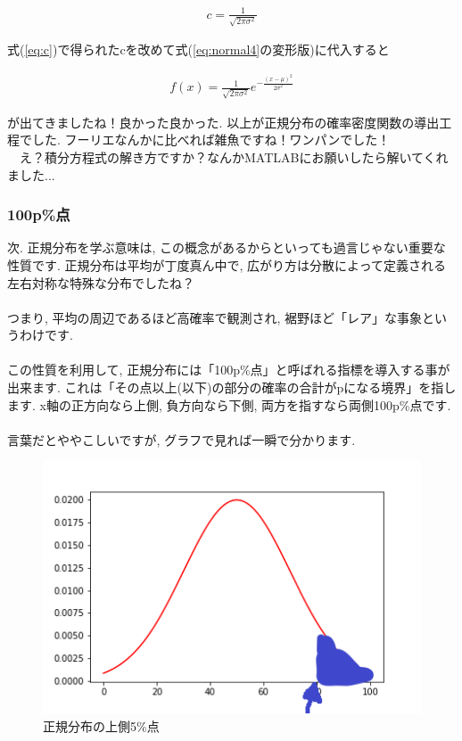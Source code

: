 \documentclass[11pt,a4paper]{jsarticle}                    %
\begin{document}
\begin{eqnarray}
\label{eq:c}
c = \frac{1}{\sqrt{2\pi\sigma^2}}
\end{eqnarray}

式(\ref{eq:c})で得られたcを改めて式(\ref{eq:normal4}の変形版)に代入すると

\begin{eqnarray}
f(x) = \frac{1}{\sqrt{2\pi\sigma^2}}e^{-\frac{(x-\mu)^2}{2\sigma^2}}
\end{eqnarray}

が出てきましたね！良かった良かった. 以上が正規分布の確率密度関数の導出工程でした. フーリエなんかに比べれば雑魚ですね！ワンパンでした！\\
　え？積分方程式の解き方ですか？なんかMATLABにお願いしたら解いてくれました...

\subsubsection{100p\%点}
次. 正規分布を学ぶ意味は, この概念があるからといっても過言じゃない重要な性質です. 正規分布は平均が丁度真ん中で, 広がり方は分散によって定義される左右対称な特殊な分布でしたね？\\\\
つまり, 平均の周辺であるほど高確率で観測され, 裾野ほど「レア」な事象というわけです.\\\\
この性質を利用して, 正規分布には「100p\%点」と呼ばれる指標を導入する事が出来ます. これは「その点以上(以下)の部分の確率の合計がpになる境界」を指します. x軸の正方向なら上側, 負方向なら下側, 両方を指すなら両側100p\%点です. \\\\
言葉だとややこしいですが, グラフで見れば一瞬で分かります.


\begin{figure}[H]
\label{im:upper}
  \centering
  \includegraphics[width=120mm,bb=0 0 432 288]{../figures/upper_p.png}
  \caption{正規分布の上側5\%点}
\end{figure}
\end{document}
